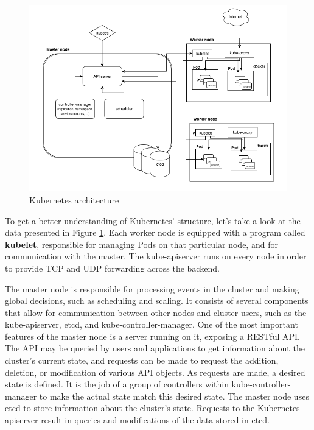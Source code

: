 \begin{figure}[!ht]
    \centering
    \includegraphics[width=1\textwidth, angle=0]{img/architecture.png}
    \caption{Kubernetes architecture~\cite{arch}}
    \label{fig:arch}
\end{figure}

To get a better understanding of Kubernetes' structure, let's take a look at the data presented
in Figure \ref{fig:arch}. Each worker node is equipped with a program called \textbf{kubelet},
responsible for managing Pods on that particular node, and for communication with the master. The
kube-apiserver runs on every node in order to provide TCP and UDP forwarding across the backend.

The master node is responsible for processing events in the cluster and making global decisions,
such as scheduling and scaling. It consists of several components that allow for communication
between other nodes and cluster users, such as the kube-apiserver, etcd, and kube-controller-manager.
One of the most important features of the master node is a server running on it, exposing a RESTful
API. The API may be queried by users and applications to get information about the cluster's current
state, and requests can be made to request the addition, deletion, or modification of various API
objects. As requests are made, a desired state is defined. It is the job of a group of controllers
within kube-controller-manager to make the actual state match this desired state. The master node
uses etcd to store information about the cluster's state. Requests to the Kubernetes apiserver
result in queries and modifications of the data stored in etcd.

